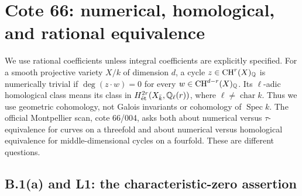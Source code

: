\section{Cote 66: numerical, homological, and rational equivalence}
\label{sec:part-b}

We use rational coefficients unless integral coefficients are explicitly specified.
For a smooth projective variety $X/k$ of dimension $d$, a cycle
$z\in\mathrm{CH}^r(X)_{{\mathbb{Q}}}$ is numerically trivial if
$\deg(z\cdot w)=0$ for every $w\in\mathrm{CH}^{d-r}(X)_{{\mathbb{Q}}}$.
Its $\ell$-adic homological class means its class in
$H^{2r}_{\mathrm{\acute et}}(X_{\bar k},{\mathbb{Q}}_\ell(r))$, where
$\ell\ne\operatorname{char}k$. Thus we use geometric cohomology, not
Galois invariants or cohomology of $\operatorname{Spec}k$.
The official Montpellier scan, cote 66/004, asks both about
numerical versus $\tau$-equivalence for curves on a threefold and about
numerical versus homological equivalence for middle-dimensional cycles on
a fourfold. These are different questions.

\subsection{B.1(a) and L1: the characteristic-zero assertion}

